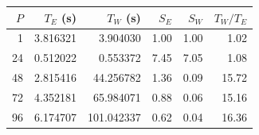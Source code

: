 \begin{center}
\small
\begin{tabular}{rrrrrr}
\toprule
$P$ & $T_E$ (s) & $T_W$ (s) & $S_E$ & $S_W$ & $T_W/T_E$ \\
\midrule
1 & 3.816321 & 3.904030 & 1.00 & 1.00 & 1.02 \\
24 & 0.512022 & 0.553372 & 7.45 & 7.05 & 1.08 \\
48 & 2.815416 & 44.256782 & 1.36 & 0.09 & 15.72 \\
72 & 4.352181 & 65.984071 & 0.88 & 0.06 & 15.16 \\
96 & 6.174707 & 101.042337 & 0.62 & 0.04 & 16.36 \\
\bottomrule
\end{tabular}
\end{center}
